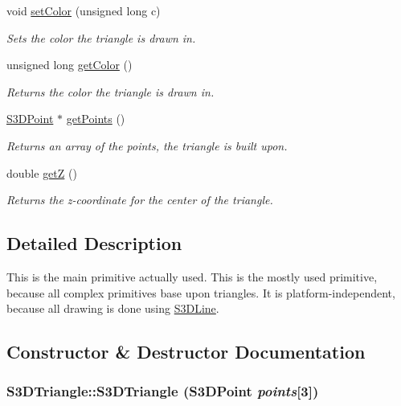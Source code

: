 \begin{DoxyCompactItemize}
void \hyperlink{class_s3_d_triangle_a2c60503c3bae194ec8247a0e2467c915}{setColor} (unsigned long c)
\begin{DoxyCompactList}\small\item\em Sets the color the triangle is drawn in. \item\end{DoxyCompactList}\item 
unsigned long \hyperlink{class_s3_d_triangle_ade8ba96094206ee3dff5c3bc743e0a1c}{getColor} ()
\begin{DoxyCompactList}\small\item\em Returns the color the triangle is drawn in. \item\end{DoxyCompactList}\item 
\hyperlink{class_s3_d_point}{S3DPoint} $\ast$ \hyperlink{class_s3_d_triangle_a1032adb6846335a47c8e8c0355b69dbd}{getPoints} ()
\begin{DoxyCompactList}\small\item\em Returns an array of the points, the triangle is built upon. \item\end{DoxyCompactList}\item 
double \hyperlink{class_s3_d_triangle_a35428b5799c8d51a6c57d1fdb5b575a1}{getZ} ()
\begin{DoxyCompactList}\small\item\em Returns the z-\/coordinate for the center of the triangle. \item\end{DoxyCompactList}\end{DoxyCompactItemize}


\subsection{Detailed Description}
This is the main primitive actually used. This is the mostly used primitive, because all complex primitives base upon triangles. It is platform-\/independent, because all drawing is done using \hyperlink{class_s3_d_line}{S3DLine}. 

\subsection{Constructor \& Destructor Documentation}
\hypertarget{class_s3_d_triangle_a2ac27d0814934c422e3fbf593c77014e}{
\subsubsection[{S3DTriangle}]{\setlength{\rightskip}{0pt plus 5cm}S3DTriangle::S3DTriangle ({\bf S3DPoint} {\em points}\mbox{[}3\mbox{]})}}
\label{class_s3_d_triangle_a2ac27d0814934c422e3fbf593c77014e}


